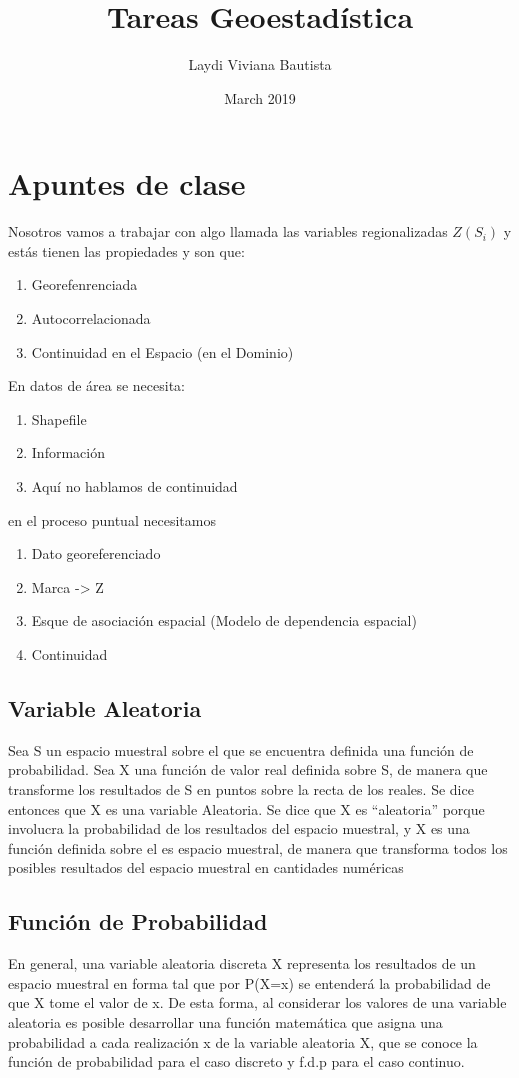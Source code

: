 \documentclass{book}
\title{Tareas Geoestadística}
\author{Laydi Viviana Bautista}
\date{March 2019}
\begin{document}
\chapter{Apuntes de clase}

Nosotros vamos a trabajar con algo llamada las variables regionalizadas $Z(S_i)$ y estás tienen las propiedades y son que: \begin{enumerate}
    \item Georefenrenciada
    \item Autocorrelacionada
    \item Continuidad en el Espacio (en el Dominio)
\end{enumerate}

En datos de área se necesita: 
\begin{enumerate}
    \item Shapefile
    \item Información
    \item Aquí no hablamos de continuidad
\end{enumerate}

en el proceso puntual necesitamos 
\begin{enumerate}
    \item Dato georeferenciado
    \item Marca -> Z
    \item Esque de asociación espacial (Modelo de dependencia espacial)
    \item Continuidad
\end{enumerate}




\section{Variable Aleatoria} Sea S un espacio muestral sobre el que se encuentra definida una función de probabilidad. Sea X una función de valor real definida sobre S, de manera que transforme los resultados de S en puntos sobre la recta de los reales. Se dice entonces que X es una variable Aleatoria.
Se dice que X es “aleatoria” porque involucra la probabilidad de los resultados del espacio muestral, y X es una función definida sobre el es espacio muestral, de manera que transforma todos los posibles resultados del espacio muestral en cantidades numéricas

\section{Función de Probabilidad}
En general, una variable aleatoria discreta X representa los resultados de un espacio muestral en forma tal que por P(X=x) se entenderá la probabilidad de que X tome el valor de x. De esta forma, al considerar los valores de una variable aleatoria es posible desarrollar una función matemática que asigna una probabilidad a cada realización x de la variable aleatoria X, que se conoce la función de probabilidad para el caso discreto y f.d.p para el caso continuo. 
\end{document}
